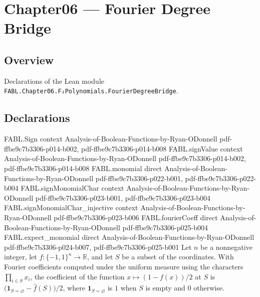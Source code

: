 \chapter{Chapter06 — Fourier Degree Bridge}
\section{Overview}

Declarations of the Lean module \texttt{FABL.Chapter06.F₂Polynomials.FourierDegreeBridge}.

\section{Declarations}

\begin{theorem}
\label{FABL.fourierCoeff_one_sub_div_two}
\leanok
{}
\proofstep
  {FABL.Sign}
  {context}
  {Analysis-of-Boolean-Functions-by-Ryan-ODonnell}
  {pdf-ffbe9c7b3306-p014-b002,
    pdf-ffbe9c7b3306-p014-b008}
\proofstep
  {FABL.signValue}
  {context}
  {Analysis-of-Boolean-Functions-by-Ryan-ODonnell}
  {pdf-ffbe9c7b3306-p014-b002,
    pdf-ffbe9c7b3306-p014-b008}
\proofstep
  {FABL.monomial}
  {direct}
  {Analysis-of-Boolean-Functions-by-Ryan-ODonnell}
  {pdf-ffbe9c7b3306-p022-b001,
    pdf-ffbe9c7b3306-p022-b004}
\proofstep
  {FABL.signMonomialChar}
  {context}
  {Analysis-of-Boolean-Functions-by-Ryan-ODonnell}
  {pdf-ffbe9c7b3306-p023-b001,
    pdf-ffbe9c7b3306-p023-b004}
\proofstep
  {FABL.signMonomialChar_injective}
  {context}
  {Analysis-of-Boolean-Functions-by-Ryan-ODonnell}
  {pdf-ffbe9c7b3306-p023-b006}
\proofstep
  {FABL.fourierCoeff}
  {direct}
  {Analysis-of-Boolean-Functions-by-Ryan-ODonnell}
  {pdf-ffbe9c7b3306-p025-b004}
\proofstep
  {FABL.expect_monomial}
  {direct}
  {Analysis-of-Boolean-Functions-by-Ryan-ODonnell}
  {pdf-ffbe9c7b3306-p024-b007,
    pdf-ffbe9c7b3306-p025-b001}
Let $n$ be a nonnegative integer, let $f:\{-1,1\}^n\to\mathbb R$, and let $S$ be a
subset of the coordinates. With Fourier coefficients computed under the uniform measure
using the characters $\prod_{i\in S}x_i$, the coefficient of the function
$x\mapsto(1-f(x))/2$ at $S$ is $\bigl(\mathbf 1_{S=\varnothing}-\widehat
f(S)\bigr)/2$, where $\mathbf 1_{S=\varnothing}$ is $1$ when $S$ is empty and $0$
otherwise.
\end{theorem}

